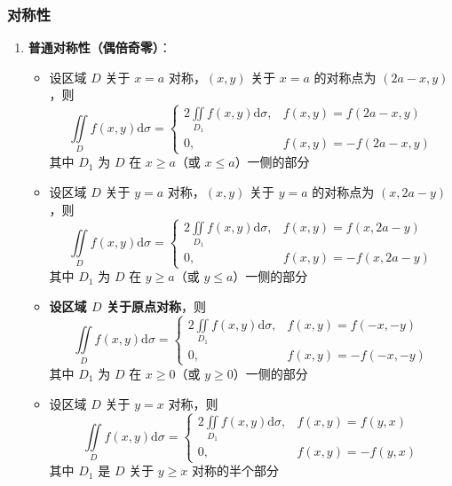 \documentclass[../book.tex]{subfiles}
\begin{document}
    \subsubsection{对称性}

    \begin{enumerate}
        \item \textbf{普通对称性（偶倍奇零）}：
        \begin{itemize}
            \item 设区域 $D$ 关于 $x = a$ 对称，$(x, y)$ 关于 $x = a$ 的对称点为 $(2a-x, y)$，则
            \[
                \iint\limits_D f(x,y) \mathrm{d}\sigma = \begin{cases}
                                                             2\iint\limits_{D_1} f(x,y) \mathrm{d}\sigma, & f(x,y) = f(2a-x, y) \\
                                                             0, & f(x,y) = -f(2a-x, y)
                \end{cases}
            \]
            其中 $D_1$ 为 $D$ 在 $x \geq a$（或 $x \leq a$）一侧的部分

            \item 设区域 $D$ 关于 $y = a$ 对称，$(x, y)$ 关于 $y = a$ 的对称点为 $(x, 2a - y)$，则
            \[
                \iint\limits_D f(x,y) \mathrm{d}\sigma = \begin{cases}
                                                             2\iint\limits_{D_1} f(x,y) \mathrm{d}\sigma, & f(x,y) = f(x, 2a-y) \\
                                                             0, & f(x,y) = -f(x, 2a-y)
                \end{cases}
            \]
            其中 $D_1$ 为 $D$ 在 $y \geq a$（或 $y \leq a$）一侧的部分

            \item \textbf{设区域 $D$ 关于原点对称}，则
            \[
                \iint\limits_D f(x,y) \mathrm{d}\sigma = \begin{cases}
                                                             2\iint\limits_{D_1} f(x,y) \mathrm{d}\sigma, & f(x,y) = f(-x,-y) \\
                                                             0, & f(x,y) = -f(-x,-y)
                \end{cases}
            \]
            其中 $D_1$ 为 $D$ 在 $x \geq 0$（或 $y \geq 0$）一侧的部分

            \item 设区域 $D$ 关于 $y = x$ 对称，则
            \[
                \iint\limits_D f(x,y) \mathrm{d}\sigma = \begin{cases}
                                                             2\iint\limits_{D_1} f(x,y) \mathrm{d}\sigma, & f(x,y) = f(y, x) \\
                                                             0, & f(x,y) = -f(y,x)
                \end{cases}
            \]
            其中 $D_1$ 是 $D$ 关于 $y \geq x$ 对称的半个部分


\end{itemize}
\end{enumerate}
\end{document}
